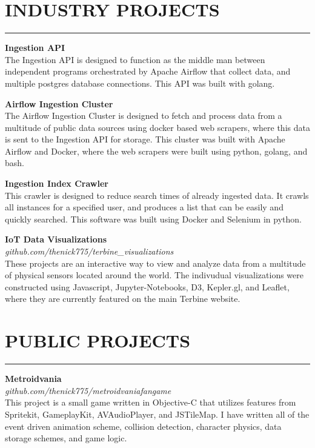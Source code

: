 \documentclass{res}
\begin{document}
\begin{resume}
\vspace{-3pt}

		\section{{INDUSTRY PROJECTS}}
    \noindent\rule[0.5ex]{\linewidth}{1pt}
		{\bf Ingestion API} \hfill \vspace{5pt} \\
			The Ingestion API is designed to function as the middle man between independent programs orchestrated by Apache Airflow that collect data, and multiple postgres database connections. This API was built with golang.
\vspace{-5pt}

		{\bf Airflow Ingestion Cluster} \hfill \vspace{5pt} \\
			The Airflow Ingestion Cluster is designed to fetch and process data from a multitude of public data sources using docker based web scrapers, where this data is sent to the Ingestion API for storage. This cluster was built with Apache Airflow and Docker, where the web scrapers were built using python, golang, and bash.
\vspace{-5pt}

		{\bf Ingestion Index Crawler} \hfill \vspace{5pt}\\
			This crawler is designed to reduce search times of already ingested data. It crawls all instances for a specified user, and produces a list that can be easily and quickly searched. This software was built using Docker and Selenium in python.
\vspace{-5pt}

		{\bf IoT Data Visualizations} \\
    \emph{github.com/thenick775/terbine\_visualizations} \hfill \vspace{4pt}\\
			These projects are an interactive way to view and analyze data from a multitude of physical sensors located around the world. The indivudual visualizations were constructed using Javascript, Jupyter-Notebooks, D3, Kepler.gl, and Leaflet, where they are currently featured on the main Terbine website.

\vspace{-3pt}

		\section{{PUBLIC PROJECTS}}
    \noindent\rule[0.5ex]{\linewidth}{1pt}
		{\bf Metroidvania} \\
			\emph{github.com/thenick775/metroidvaniafangame} \hfill \vspace{3pt}\\
			This project is a small game written in Objective-C that utilizes features from Spritekit, GameplayKit, AVAudioPlayer, and JSTileMap. I have written all of the event driven animation scheme, collision detection, character physics, data storage schemes, and game logic.
\vspace{-4pt}


\end{resume}
\end{document}
